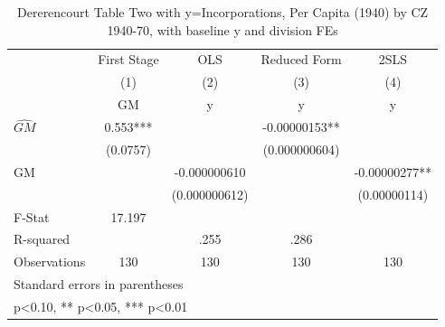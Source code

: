 \begin{table}[htbp]\centering
\def\sym#1{\ifmmode^{#1}\else\(^{#1}\)\fi}
\caption{Dererencourt Table Two with y=Incorporations, Per Capita (1940) by CZ 1940-70, with baseline y and division FEs}
\begin{tabular}{l*{4}{c}}
\toprule
                    & First Stage   &         OLS   &Reduced Form   &        2SLS   \\
                    &\multicolumn{1}{c}{(1)}&\multicolumn{1}{c}{(2)}&\multicolumn{1}{c}{(3)}&\multicolumn{1}{c}{(4)}\\
                    &\multicolumn{1}{c}{GM}&\multicolumn{1}{c}{y}&\multicolumn{1}{c}{y}&\multicolumn{1}{c}{y}\\
\midrule
$\hat{GM}$          &       0.553***&               & -0.00000153** &               \\
                    &    (0.0757)   &               &(0.000000604)   &               \\
\addlinespace
GM                  &               &-0.000000610   &               & -0.00000277** \\
                    &               &(0.000000612)   &               &(0.00000114)   \\
\midrule
F-Stat              &      17.197   &               &               &               \\
R-squared           &               &        .255   &        .286   &               \\
Observations        &         130   &         130   &         130   &         130   \\
\bottomrule
\multicolumn{5}{l}{\footnotesize Standard errors in parentheses}\\
\multicolumn{5}{l}{\footnotesize * p<0.10, ** p<0.05, *** p<0.01}\\
\end{tabular}
\end{table}
